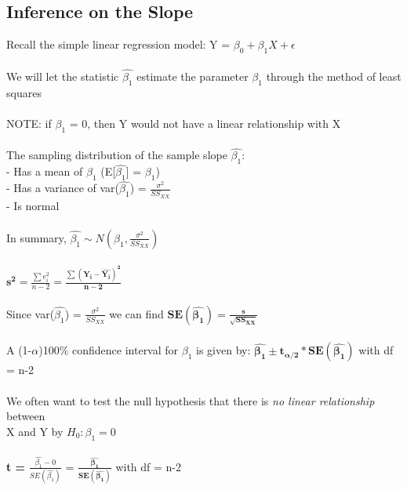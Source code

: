 \documentclass[12pt, a4paper]{article}
\begin{document}
	\subsection{Inference on the Slope}
	Recall the simple linear regression model: Y = $\beta_0 + \beta_1X + \epsilon$ \\~\\
	We will let the statistic $\hat{\beta_1}$ estimate the parameter $\beta_1$ through the method of least squares \\~\\
	NOTE: if $\beta_1$ = 0, then Y would not have a linear relationship with X \\~\\
	The sampling distribution of the sample slope $\hat{\beta_1}$: \\
	- Has a mean of $\beta_1$ (E[$\hat{\beta_1}$] = $\beta_1$) \\
	- Has a variance of var($\hat{\beta_1}$) = $\frac{\sigma^2}{SS_{XX}}$ \\
	- Is normal \\~\\
	In summary, $\hat{\beta_1} \sim N(\beta_1, \frac{\sigma^2}{SS_{XX}})$ \\~\\
	\large $\bm{s^2} = \frac{\sum e_i^2}{n-2} = \bm{\frac{\sum (Y_i-\hat{Y_i})^2}{n-2}}$ \normalsize \\~\\
	Since var($\hat{\beta_1}$) = $\frac{\sigma^2}{SS_{XX}}$ we can find $\bm{SE(\hat{\beta_1}) = \frac{s}{\sqrt{SS_{XX}}}}$ \\~\\
	A (1-$\alpha$)100\% confidence interval for $\beta_1$ is given by: $\bm{\hat{\beta_1} \pm t_{\alpha/2}*SE(\hat{\beta_1})}$ with df = n-2\\~\\
	We often want to test the null hypothesis that there is \textit{no linear relationship} between \\ X and Y by $H_0: \beta_1 = 0$ \\~\\
	\large \textbf{t =} $\frac{\hat{\beta_1} - 0}{SE(\hat{\beta_1})}$ = $\bm{\frac{\hat{\beta_1}}{SE(\hat{\beta_1})}}$ \normalsize with df = n-2 \newpage
	
\end{document}
